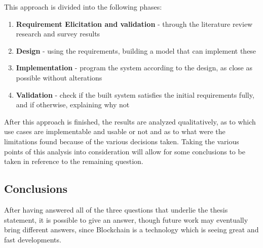 
This approach is divided into the following phases:
\begin{enumerate}
\item \textbf{Requirement Elicitation and validation} - through the literature review research and survey results 
\item \textbf{Design} - using the requirements, building a model that can implement these 
\item \textbf{Implementation} - program the system according to the design, as close as possible without alterations 
\item \textbf{Validation} - check if the built system satisfies the initial requirements fully, and if otherwise, explaining why not
\end{enumerate}

After this approach is finished, the results are analyzed qualitatively, as to which use cases are implementable and usable or not and as to what were the limitations found because of the various decisions taken. Taking the various points of this analysis into consideration will allow for some conclusions to be taken in reference to the remaining question.



\subsection{Conclusions}

After having answered all of the three questions that underlie the thesis statement, it is possible to give an answer, though future work may eventually bring different answers, since Blockchain is a technology which is seeing great and fast developments.


